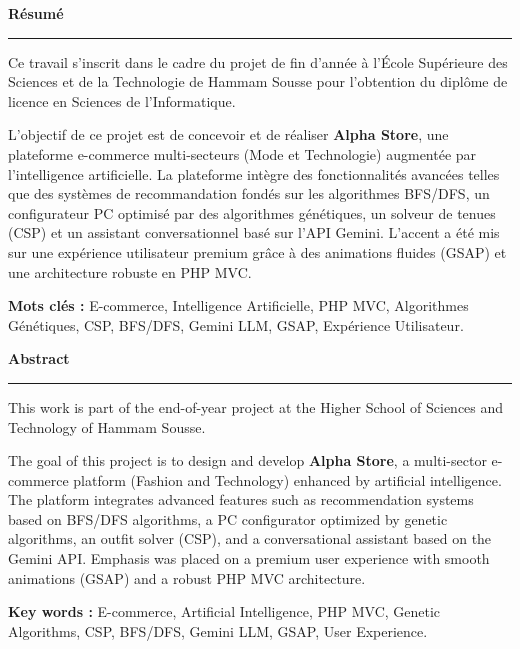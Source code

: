 \pagestyle{empty} %

\vspace*{\fill}

\begin{center}
  \fontsize{20}{20}\selectfont\bfseries Résumé
\end{center}
\hrule

\vspace{1cm}

Ce travail s'inscrit dans le cadre du projet de fin d'année à l'École Supérieure des Sciences et de la Technologie de Hammam Sousse pour l'obtention du diplôme de licence en Sciences de l'Informatique.
\par \vspace{5mm}
L’objectif de ce projet est de concevoir et de réaliser \textbf{Alpha Store}, une plateforme e-commerce multi-secteurs (Mode et Technologie) augmentée par l'intelligence artificielle. La plateforme intègre des fonctionnalités avancées telles que des systèmes de recommandation fondés sur les algorithmes BFS/DFS, un configurateur PC optimisé par des algorithmes génétiques, un solveur de tenues (CSP) et un assistant conversationnel basé sur l'API Gemini. L'accent a été mis sur une expérience utilisateur premium grâce à des animations fluides (GSAP) et une architecture robuste en PHP MVC.
\par \vspace{5mm}
\textbf{Mots clés : } E-commerce, Intelligence Artificielle, PHP MVC, Algorithmes Génétiques, CSP, BFS/DFS, Gemini LLM, GSAP, Expérience Utilisateur.

\vspace{3cm}

\begin{center}
  \fontsize{20}{20}\selectfont\bfseries Abstract
\end{center}

\hrule
\vspace{1cm}
This work is part of the end-of-year project at the Higher School of Sciences and Technology of Hammam Sousse.
\par \vspace{5mm}
The goal of this project is to design and develop \textbf{Alpha Store}, a multi-sector e-commerce platform (Fashion and Technology) enhanced by artificial intelligence. The platform integrates advanced features such as recommendation systems based on BFS/DFS algorithms, a PC configurator optimized by genetic algorithms, an outfit solver (CSP), and a conversational assistant based on the Gemini API. Emphasis was placed on a premium user experience with smooth animations (GSAP) and a robust PHP MVC architecture.
\par \vspace{5mm}
\textbf{Key words : } E-commerce, Artificial Intelligence, PHP MVC, Genetic Algorithms, CSP, BFS/DFS, Gemini LLM, GSAP, User Experience.
\vspace*{\fill}
